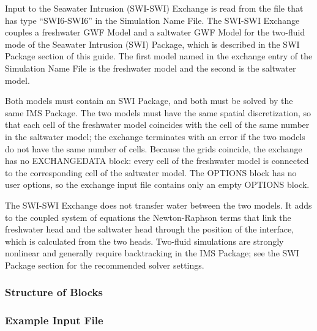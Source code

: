 Input to the Seawater Intrusion (SWI-SWI) Exchange is read from the file that has type ``SWI6-SWI6'' in the Simulation Name File.  The SWI-SWI Exchange couples a freshwater GWF Model and a saltwater GWF Model for the two-fluid mode of the Seawater Intrusion (SWI) Package, which is described in the SWI Package section of this guide.  The first model named in the exchange entry of the Simulation Name File is the freshwater model and the second is the saltwater model.

Both models must contain an SWI Package, and both must be solved by the same IMS Package.  The two models must have the same spatial discretization, so that each cell of the freshwater model coincides with the cell of the same number in the saltwater model; the exchange terminates with an error if the two models do not have the same number of cells.  Because the grids coincide, the exchange has no EXCHANGEDATA block: every cell of the freshwater model is connected to the corresponding cell of the saltwater model.  The OPTIONS block has no user options, so the exchange input file contains only an empty OPTIONS block.

The SWI-SWI Exchange does not transfer water between the two models.  It adds to the coupled system of equations the Newton-Raphson terms that link the freshwater head and the saltwater head through the position of the interface, which is calculated from the two heads.  Two-fluid simulations are strongly nonlinear and generally require backtracking in the IMS Package; see the SWI Package section for the recommended solver settings.

\vspace{5mm}
\subsubsection{Structure of Blocks}


\vspace{5mm}
\subsubsection{Example Input File}

